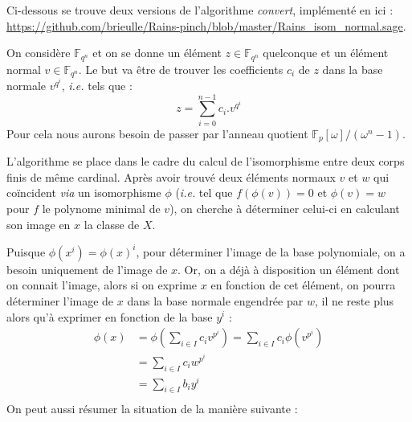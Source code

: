 \documentclass[a4paper]{article} %
\numberwithin{equation}{section}
\newcommand\GF[1]{\mathbb{F}_{#1}}
\begin{document}
\newtheorem{thm}{Thèorème}[subsection]
\newtheorem{lem}[thm]{Lemme}
\newtheorem{cor}{Corollaire}
\newtheorem{prop}[thm]{Proposition}
\theoremstyle{definition}
\newtheorem*{defn}{Définition}
\newtheorem*{ex}{Exemple}
\theoremstyle{remark}
\newtheorem{rem}{Remarque}[subsection]
Ci-dessous se trouve deux versions de l'algorithme \textit{convert}, implémenté en  ici : \url{https://github.com/brieulle/Rains-pinch/blob/master/Rains\_isom\_normal.sage}.\\\par
On considère $\GF{q^n}$ et on se donne un élément $z\in\GF{q^n}$ quelconque et un élément normal $v\in\GF{q^n}$. Le but va être de trouver les coefficients $c_i$ de $z$ dans la base normale $v^{q^i}$, \textit{i.e.} tels que :
\[z = \sum_{i=0}^{n-1}{c_i.v^{q^i}}\]
Pour cela nous aurons besoin de passer par l'anneau quotient $\mathbb{F}_p[\omega]/(\omega^n - 1)$.\\\par
L'algorithme se place dans le cadre du calcul de l'isomorphisme entre deux corps finis de même cardinal. Après avoir trouvé deux éléments normaux $v$ et $w$ qui coïncident \textit{via} un isomorphisme $\phi$ (\textit{i.e.} tel que $f(\phi(v)) = 0$ et $\phi(v) = w$ pour $f$ le polynome minimal de $v$), on cherche à déterminer celui-ci en calculant son image en $x$ la classe de $X$.\par

Puisque $\phi(x^i) = \phi(x)^i$, pour déterminer l'image de la base polynomiale, on a besoin uniquement de l'image de $x$. Or, on a déjà à disposition un élément dont on connait l'image, alors si on exprime $x$ en fonction de cet élément, on pourra déterminer l'image de $x$ dans la base normale engendrée par $w$, il ne reste plus alors qu'à exprimer en fonction de la base $y^i$ :
\begin{align*}
\phi(x) &= \phi(\sum_{i\in I}{c_iv^{p^i}})= \sum_{i\in I}{c_i\phi(v^{p^i})}\\
&= \sum_{i\in I}{c_iw^{p^i}}\\
&= \sum_{i\in I}{b_iy^i}\\
\end{align*}
On peut aussi résumer la situation de la manière suivante :
\end{document}

